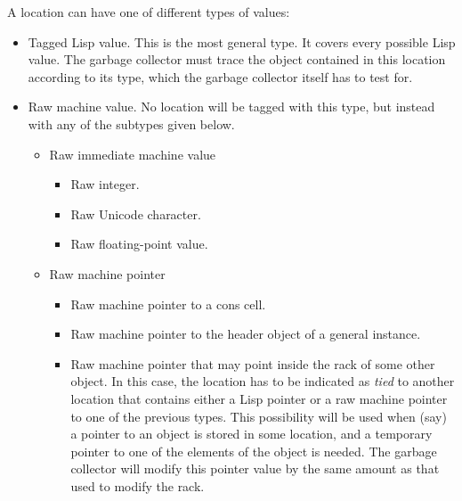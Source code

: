 A location can have one of different types of values:

\begin{itemize}
\item Tagged Lisp value.  This is the most general type.  It covers
  every possible Lisp value.  The garbage collector must trace the
  object contained in this location according to its type, which the
  garbage collector itself has to test for. 
\item Raw machine value.  No location will be tagged with this type,
  but instead with any of the subtypes given below.
  \begin{itemize}
  \item Raw immediate machine value
    \begin{itemize}
      \item Raw integer.
      \item Raw Unicode character.
      \item Raw floating-point value.
    \end{itemize}
  \item Raw machine pointer
    \begin{itemize}
    \item Raw machine pointer to a cons cell.  
    \item Raw machine pointer to the header object of a general
      instance.
    \item Raw machine pointer that may point inside the rack
      of some other object. In this case, the location has to
      be indicated as \emph{tied} to another location that contains
      either a Lisp pointer or a raw machine pointer to one of the
      previous types.  This possibility will be used when (say) a
      pointer to an object is stored in some location, and a temporary
      pointer to one of the elements of the object is needed.  The
      garbage collector will modify this pointer value by the same
      amount as that used to modify the rack. 
    \end{itemize}
  \end{itemize}
\end{itemize}

